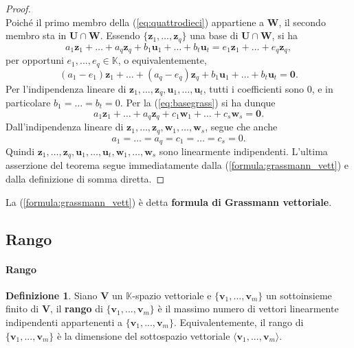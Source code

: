 \documentclass{article}
\theoremstyle{plain}
\theoremstyle{definition}
\newtheorem{defn}{Definizione}[section]
\theoremstyle{remark}
\begin{document}
\begin{proof}
\begin{equation}
    \end{equation}
    Poiché il primo membro della (\ref{eq:quattrodieci}) appartiene a \( \mathbf{W} \), 
    il secondo membro sta in \( \mathbf{U} \cap \mathbf{W} \). 
    Essendo \( \{\mathbf{z}_1, \ldots, \mathbf{z}_q\} \) una base di \( \mathbf{U} \cap \mathbf{W} \), si ha
    \[ a_1\mathbf{z}_1 + \ldots + a_q\mathbf{z}_q + b_1\mathbf{u}_1 + \ldots + b_t\mathbf{u}_t = e_1\mathbf{z}_1 + \ldots + e_q\mathbf{z}_q, \]
    per opportuni \( e_1, ...,  e_q \in \mathbb{K} \), o equivalentemente,
    \[ (a_1 - e_1)\mathbf{z}_1 + \ldots + (a_q - e_q)\mathbf{z}_q + b_1\mathbf{u}_1 + \ldots + b_t\mathbf{u}_t = \mathbf{0}. \]
    Per l'indipendenza lineare di \( \mathbf{z}_1, \ldots, \mathbf{z}_q, \mathbf{u}_1, \ldots, \mathbf{u}_t \), tutti i coefficienti sono $0$, e in particolare \( b_1 = \ldots = b_t = 0 \). 
    Per la (\ref{eq:basegrass}) si ha dunque
    \[ a_1\mathbf{z}_1 + \ldots + a_q\mathbf{z}_q + c_1\mathbf{w}_1 + \ldots + c_s\mathbf{w}_s = \mathbf{0}. \]
    Dall'indipendenza lineare di \( \mathbf{z}_1, \ldots, \mathbf{z}_q, \mathbf{w}_1, \ldots, \mathbf{w}_s \), segue che anche
    \[ a_1 = \ldots = a_q = c_1 = \ldots = c_s = 0. \]
    Quindi \( \mathbf{z}_1, \ldots, \mathbf{z}_q, \mathbf{u}_1, \ldots, \mathbf{u}_t, \mathbf{w}_1, \ldots, \mathbf{w}_s \) sono linearmente indipendenti. 
    L'ultima asserzione del teorema segue immediatamente dalla (\ref{formula:grassmann_vett}) e dalla definizione di somma diretta.
\end{proof}

\vspace{10pt}

La (\ref{formula:grassmann_vett}) è detta \textbf{formula di Grassmann vettoriale}.


\newpage
\subsection{Rango}
\vspace{20pt}

\paragraph{Rango}
\begin{bxthm}
\begin{defn}
    Siano $\mathbf{V}$ un $\mathbb{K}$-spazio vettoriale e $\{\mathbf{v}_{1},...,\mathbf{v}_{m}\}$ un sottoinsieme finito di $\mathbf{V}$, 
    il \textbf{rango} di $\{\mathbf{v}_{1},...,\mathbf{v}_{m}\}$ è il massimo numero di vettori linearmente indipendenti 
    appartenenti a $\{\mathbf{v}_{1},...,\mathbf{v}_{m}\}$. 
    Equivalentemente, il rango di $\{\mathbf{v}_{1},...,\mathbf{v}_{m}\}$ è la dimensione del sottospazio vettoriale 
    $\langle \mathbf{v}_{1},...,\mathbf{v}_{m}\rangle $.
\end{defn}
\end{bxthm}
\end{document}
